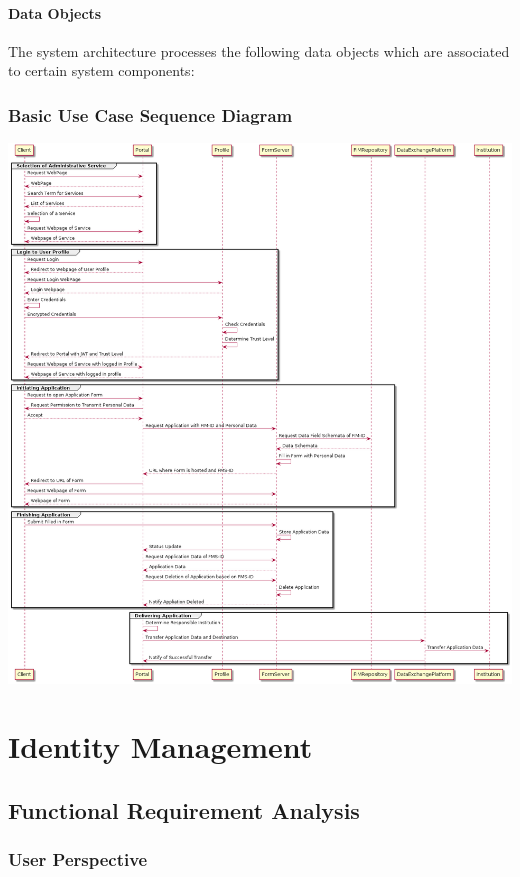\documentclass[
     12pt,         %
     a4paper,      %
     BCOR=10mm,version=first,     %
     DIV=14,version=first,        %
     ]{scrreprt}
\begin{document}
\subsubsection{Data Objects}
The system architecture processes the following data objects which are associated to certain system components:

\subsection{Basic Use Case Sequence Diagram}

\includegraphics[width=15cm]{Basic Use Case.png}


\chapter{Identity Management}

\section{Functional Requirement Analysis}

\subsection{User Perspective}
\end{document}
